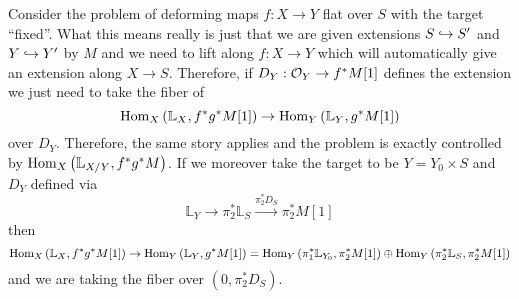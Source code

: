 \documentclass[12pt]{article}
\newcommand{\LL}{\mathbb{L}}
\begin{document}
\begin{example}
Consider the problem of deforming maps $f : X \to Y$ flat over $S$ with the target ``fixed''. What this means really is just that we are given extensions $S \hookrightarrow S'$ and $Y \hookrightarrow Y'$ by $M$ and we need to lift along $f : X \to Y$ which will automatically give an extension along $X \to S$. Therefore, if $D_Y : \mathcal{O}_{Y} \to f^* M[1]$ defines the extension we just need to take the fiber of
\[ \Hom{X}{\LL_X}{f^* g^* M[1]} \to \Hom{Y}{\LL_Y}{g^* M[1]} \]
over $D_Y$. Therefore, the same story applies and the problem is exactly controlled by $\Hom{X}{\LL_{X/Y}}{f^* g^* M}$.
If we moreover take the target to be $Y = Y_0 \times S$ and $D_Y$ defined via
\[ \LL_{Y} \to \pi_2^* \LL_S \xrightarrow{\pi_2^* D_S} \pi_2^* M[1] \]
then 
\[ \Hom{X}{\LL_X}{f^* g^* M[1]} \to \Hom{Y}{\LL_Y}{g^* M[1]} = \Hom{Y}{\pi_1^* \LL_{Y_0}}{\pi_2^* M[1]} \oplus \Hom{Y}{\pi_2^* \LL_{S}}{\pi_2^* M[1]} \]
and we are taking the fiber over $(0, \pi_2^* D_S)$.
\end{example}
\end{document}
